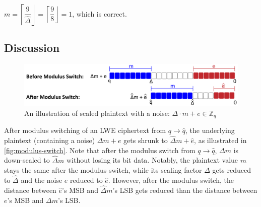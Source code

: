 $ $

$m = \left \lceil \dfrac{9}{\hat \Delta} \right \rfloor = \left \lceil \dfrac{9}{8} \right \rfloor = 1$, which is correct.


\subsection{Discussion}
\label{subsubsec:modulus-switch-lwe-discuss}

\begin{figure}[h!]
    \centering
  \includegraphics[width=0.7\linewidth]{figures/modulus-switching.pdf}
  \caption{An illustration of scaled plaintext with a noise: $\Delta \cdot m + e \in \mathbb{Z}_q$}
  \label{fig:modulus-switch}
\end{figure}

 After modulus switching of an LWE ciphertext from $q \rightarrow \hat{q}$, the underlying plaintext (containing a noise) $\Delta m + e$ gets shrunk to $\hat{\Delta}m + \hat{e}$, as illustrated in \autoref{fig:modulus-switch}. Note that after the modulus switch from $q \rightarrow \hat{q}$, $\Delta m$ is down-scaled to $\hat{\Delta} m$ without losing its bit data. Notably, the plaintext value $m$ stays the same after the modulus switch, while its scaling factor $\Delta$ gets reduced to $\hat{\Delta}$ and the noise $e$ reduced to $\hat e$. However, after the modulus switch, the distance between $\hat e$'s MSB and $\hat \Delta m$'s LSB gets reduced than the distance between $e$'s MSB and $\Delta m$'s LSB.




